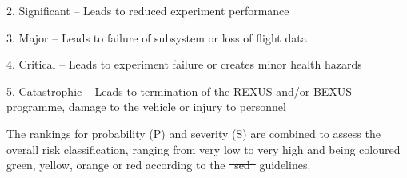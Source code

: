 \documentclass[ %
  a4paper, %
  11pt, %
  openany, %
  parskip, %
  toc=totoc, %
  listof=totoc, %
  bibliography=totoc %
]{scrreprt} %
\makeatletter
\providecommand{\DIFaddtex}[1]{{\protect\color{blue}\uwave{#1}}} %
\providecommand{\DIFdeltex}[1]{{\protect\color{red}\sout{#1}}} %
\providecommand{\DIFaddbegin}{} %
\providecommand{\DIFaddend}{} %
\providecommand{\DIFdelbegin}{} %
\providecommand{\DIFdelend}{} %
\providecommand{\DIFadd}[1]{\texorpdfstring{\DIFaddtex{#1}}{#1}} %
\providecommand{\DIFdel}[1]{\texorpdfstring{\DIFdeltex{#1}}{}} %
\providecommand{\DIFscaledelfig}{0.5}
\newlength{\DIFdelgraphicswidth} %
\newlength{\DIFdelgraphicsheight} %
\providecommand{\DIFaddincludegraphics}[2][]{{\color{blue}\fbox{\DIFOincludegraphics[#1]{#2}}}} %
\providecommand{\DIFdelincludegraphics}[2][]{%
\sbox{\DIFdelgraphicsbox}{\DIFOincludegraphics[#1]{#2}}%
\settoboxwidth{\DIFdelgraphicswidth}{\DIFdelgraphicsbox} %
\settoboxtotalheight{\DIFdelgraphicsheight}{\DIFdelgraphicsbox} %
\scalebox{\DIFscaledelfig}{%
\parbox[b]{\DIFdelgraphicswidth}{\usebox{\DIFdelgraphicsbox}\\[-\baselineskip] \rule{\DIFdelgraphicswidth}{0em}}\llap{\resizebox{\DIFdelgraphicswidth}{\DIFdelgraphicsheight}{%
\setlength{\unitlength}{\DIFdelgraphicswidth}%
\begin{picture}(1,1)%
\thicklines\linethickness{2pt} %
{\color[rgb]{1,0,0}\put(0,0){\framebox(1,1){}}}%
{\color[rgb]{1,0,0}\put(0,0){\line( 1,1){1}}}%
{\color[rgb]{1,0,0}\put(0,1){\line(1,-1){1}}}%
\end{picture}%
}\hspace*{3pt}}} %
} %
\DeclareRobustCommand{\DIFaddbegin}{\DIFOaddbegin \let\includegraphics\DIFaddincludegraphics} %
\DeclareRobustCommand{\DIFaddend}{\DIFOaddend \let\includegraphics\DIFOincludegraphics} %
\DeclareRobustCommand{\DIFdelbegin}{\DIFOdelbegin \let\includegraphics\DIFdelincludegraphics} %
\DeclareRobustCommand{\DIFdelend}{\DIFOaddend \let\includegraphics\DIFOincludegraphics} %
\let\sout@orig\sout %
\renewcommand{\sout}[1]{\ifmmode\text{\sout@orig{\ensuremath{#1}}}\else\sout@orig{#1}\fi} %
\makeatother
\begin{document}
2. Significant -- Leads to reduced experiment performance

3. Major -- Leads to failure of subsystem or loss of flight data

4. Critical -- Leads to experiment failure or creates minor health hazards

5. Catastrophic -- Leads to termination of the REXUS and/or BEXUS programme, damage to the vehicle or injury to personnel

The rankings for probability (P) and severity (S) are combined to assess the overall risk classification, ranging from very low to very high and being coloured green, yellow, orange or red according to the \DIFdelbegin \DIFdel{\mbox{%
\ac{sed} }\hskip0pt%
}\DIFdelend \DIFaddbegin \DIFadd{\mbox{%
\gls{sed} }\hskip0pt%
}\DIFaddend guidelines.
\end{document}
